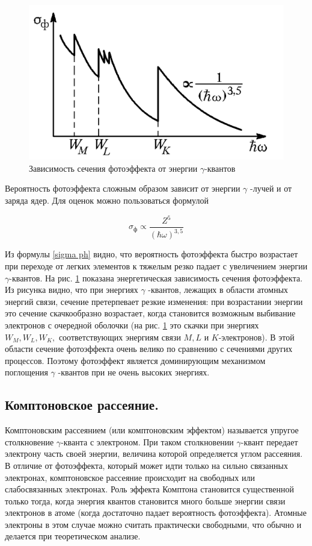 \documentclass[a4paper, 12pt]{article}%
\begin{document}
	\begin{figure}
		\includegraphics[width=\linewidth]{images/photo.png}
		\caption{Зависимость сечения фотоэффекта от энергии $\gamma$-квантов}
		\label{ris photo}
	\end{figure}
	
	Вероятность фотоэффекта сложным образом зависит от энергии
	$\gamma$ -лучей и от заряда ядер. Для оценок можно пользоваться формулой
	
	\begin{equation}\label{sigma ph}
	\sigma_{\text{ф}} \propto \dfrac{Z^5}{(\hbar\omega)^{3,5}}
	\end{equation}
	
	Из формулы \eqref{sigma ph} видно, что вероятность фотоэффекта быстро возрастает при переходе от легких элементов к тяжелым резко падает с увеличением энергии $\gamma$-квантов. На рис. \ref{ris photo} показана энергетическая зависимость сечения фотоэффекта. Из рисунка видно, что при энергиях $\gamma$ -квантов, лежащих в области атомных энергий связи, сечение претерпевает резкие изменения: при возрастании энергии это сечение скачкообразно возрастает, когда становится возможным выбивание электронов с очередной оболочки (на рис. \ref{ris photo} это скачки при энергиях $ W_M, W_L, W_K, $ соответствующих энергиям связи $ M, L $  и $ K $-электронов). В этой области сечение фотоэффекта очень велико по сравнению с сечениями других процессов. Поэтому фотоэффект является доминирующим механизмом поглощения $\gamma$ -квантов при не очень высоких энергиях.
	
	\subsection{Комптоновское рассеяние.} Комптоновским рассеянием (или комптоновским эффектом) называется упругое столкновение $\gamma$-кванта с электроном. При таком столкновении $\gamma$-квант передает электрону часть своей энергии, величина которой определяется углом рассеяния. В отличие от фотоэффекта, который может идти только на сильно связанных электронах, комптоновское рассеяние происходит на свободных или слабосвязанных электронах. Роль эффекта Комптона становится
	существенной только тогда, когда энергия квантов становится много
	больше энергии связи электронов в атоме (когда достаточно падает
	вероятность фотоэффекта). Атомные электроны в этом случае можно
	считать практически свободными, что обычно и делается при теоретическом анализе.
	
\end{document}
